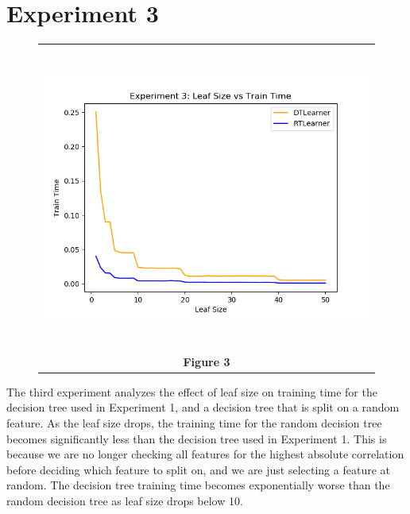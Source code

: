\documentclass[
	letterpaper, %
]{jdf}
\begin{document}
\section{Experiment 3}
\begin{figure}[h]
	\begin{tabular}{c}
		\includegraphics[height=10cm]{experiment_3a.png} \\
		\textbf{Figure 3} \\ 
	\end{tabular}
\end{figure}


The third experiment analyzes the effect of leaf size on training time for the decision tree used in Experiment 1, and a decision tree that is split on a random feature. As the leaf size drops, the training time for the random decision tree becomes significantly less than the decision tree used in Experiment 1.  This is because we are no longer checking all features for the highest absolute correlation before deciding which feature to split on, and we are just selecting a feature at random. The decision tree training time becomes exponentially worse than the random decision tree as leaf size drops below 10.

\pagebreak
\end{document}
